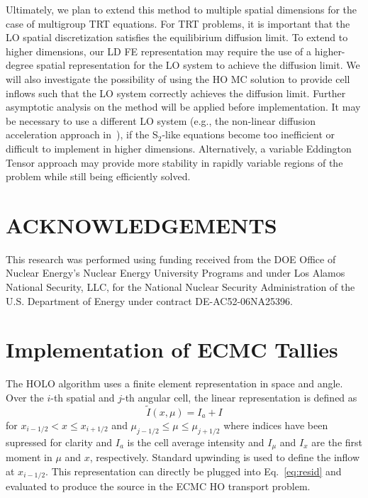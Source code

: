 \documentclass{mc2013}
\newcommand{\il}{{i-1/2}}
\newcommand{\ir}{{i+1/2}}
\newcommand{\jl}{{j-1/2}}
\newcommand{\jr}{{j+1/2}}
\begin{document}
Ultimately, we plan to extend this method to multiple spatial dimensions for the 
case of multigroup TRT equations.  For TRT problems, it is important that
the LO spatial discretization satisfies the equilibirium diffusion limit.  To extend
to higher dimensions, our LD FE representation may require the use of a higher-degree
spatial representation for the LO system to achieve the diffusion
limit.  We will also
investigate the possibility of using the HO MC solution to provide cell inflows such
that the LO system correctly achieves the diffusion
limit.  Further asymptotic
analysis on the method will be applied before implementation.    It may be necessary to use a different LO system (e.g., the non-linear diffusion
acceleration approach in~\cite{rmc}), if the S$_2$-like equations become too
inefficient or difficult to implement in higher dimensions.  Alternatively, a
variable Eddington Tensor approach may provide more stability in rapidly variable
regions of the problem while still being
efficiently solved.

\section*{ACKNOWLEDGEMENTS}

This research was performed using funding received from the DOE Office of Nuclear
Energy's Nuclear Energy University Programs and under Los Alamos National Security,
LLC, for the National Nuclear Security Administration of the U.S. Department of
Energy under contract DE-AC52-06NA25396. 


\setlength{\baselineskip}{12pt}



\appendix

\section{Implementation of ECMC Tallies}

The HOLO algorithm uses a finite element representation in space and angle.  Over the
$i$-th spatial and $j$-th angular cell, the linear representation is defined as
\begin{equation}
    \tilde I(x,\mu) = I_a + I
\end{equation}
for $x_\il <  x \leq x_\ir$ and $\mu_\jl \leq \mu \leq \mu_\jr$ where indices have
been supressed for clarity and $I_a$ is the cell average intensity and $I_\mu$ and $I_x$ are
the first moment in $\mu$ and $x$, respectively.  Standard upwinding is used to
define the inflow at $x_{i-1/2}$. This representation can directly be plugged into
Eq.~\eqref{eq:resid} and evaluated to produce the source in the ECMC HO transport
problem.  
\end{document}
